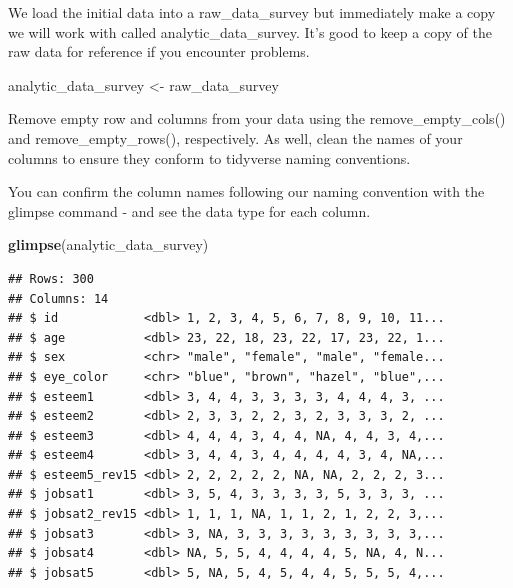 \documentclass[
]{krantz}
\makeatletter
\newenvironment{Shaded}{\begin{snugshade}}{\end{snugshade}}
\newcommand{\CommentTok}[1]{\textcolor[rgb]{0.37,0.37,0.37}{\textit{#1}}}
\newcommand{\KeywordTok}[1]{\textcolor[rgb]{0.27,0.27,0.27}{\textbf{#1}}}
\newcommand{\NormalTok}[1]{#1}
\newcommand{\OperatorTok}[1]{\textcolor[rgb]{0.43,0.43,0.43}{\textbf{#1}}}
\newcommand{\StringTok}[1]{\textcolor[rgb]{0.5,0.5,0.5}{#1}}
\newenvironment{kframe}{%
\medskip{}
\setlength{\fboxsep}{.8em}
 \def\at@end@of@kframe{}%
 \ifinner\ifhmode%
  \def\at@end@of@kframe{\end{minipage}}%
  \begin{minipage}{\columnwidth}%
 \fi\fi%
 \def\FrameCommand##1{\hskip\@totalleftmargin \hskip-\fboxsep
 \colorbox{shadecolor}{##1}\hskip-\fboxsep
     \hskip-\linewidth \hskip-\@totalleftmargin \hskip\columnwidth}%
 \MakeFramed {\advance\hsize-\width
   \@totalleftmargin\z@ \linewidth\hsize
   \@setminipage}}%
 {\par\unskip\endMakeFramed%
 \at@end@of@kframe}
\renewenvironment{Shaded}{\begin{kframe}}{\end{kframe}}
\makeatother
\begin{document}
We load the initial data into a raw\_data\_survey but immediately make a copy we will work with called analytic\_data\_survey. It's good to keep a copy of the raw data for reference if you encounter problems.

\begin{Shaded}
\begin{Highlighting}[]
\NormalTok{analytic_data_survey <-}\StringTok{ }\NormalTok{raw_data_survey}
\end{Highlighting}
\end{Shaded}

Remove empty row and columns from your data using the remove\_empty\_cols() and remove\_empty\_rows(), respectively. As well, clean the names of your columns to ensure they conform to tidyverse naming conventions.

\begin{Shaded}
\end{Shaded}

You can confirm the column names following our naming convention with the glimpse command - and see the data type for each column.

\begin{Shaded}
\begin{Highlighting}[]
\KeywordTok{glimpse}\NormalTok{(analytic_data_survey)}
\end{Highlighting}
\end{Shaded}

\begin{verbatim}
## Rows: 300
## Columns: 14
## $ id            <dbl> 1, 2, 3, 4, 5, 6, 7, 8, 9, 10, 11...
## $ age           <dbl> 23, 22, 18, 23, 22, 17, 23, 22, 1...
## $ sex           <chr> "male", "female", "male", "female...
## $ eye_color     <chr> "blue", "brown", "hazel", "blue",...
## $ esteem1       <dbl> 3, 4, 4, 3, 3, 3, 3, 4, 4, 4, 3, ...
## $ esteem2       <dbl> 2, 3, 3, 2, 2, 3, 2, 3, 3, 3, 2, ...
## $ esteem3       <dbl> 4, 4, 4, 3, 4, 4, NA, 4, 4, 3, 4,...
## $ esteem4       <dbl> 3, 4, 4, 3, 4, 4, 4, 4, 3, 4, NA,...
## $ esteem5_rev15 <dbl> 2, 2, 2, 2, 2, NA, NA, 2, 2, 2, 3...
## $ jobsat1       <dbl> 3, 5, 4, 3, 3, 3, 3, 5, 3, 3, 3, ...
## $ jobsat2_rev15 <dbl> 1, 1, 1, NA, 1, 1, 2, 1, 2, 2, 3,...
## $ jobsat3       <dbl> 3, NA, 3, 3, 3, 3, 3, 3, 3, 3, 3,...
## $ jobsat4       <dbl> NA, 5, 5, 4, 4, 4, 4, 5, NA, 4, N...
## $ jobsat5       <dbl> 5, NA, 5, 4, 5, 4, 4, 5, 5, 5, 4,...
\end{verbatim}
\end{document}
